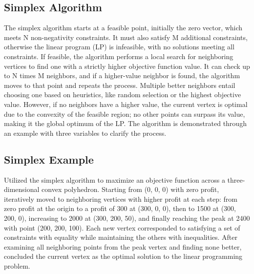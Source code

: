 \subsection*{Simplex Algorithm}
The simplex algorithm starts at a feasible point, initially the zero vector, which meets N non-negativity constraints.
It must also satisfy M additional constraints, otherwise the linear program (LP) is infeasible, with no solutions meeting all constraints.
If feasible, the algorithm performs a local search for neighboring vertices to find one with a strictly higher objective function value.
It can check up to N times M neighbors, and if a higher-value neighbor is found, the algorithm moves to that point and repeats the process.
Multiple better neighbors entail choosing one based on heuristics, like random selection or the highest objective value.
However, if no neighbors have a higher value, the current vertex is optimal due to the convexity of the feasible region; no other points can surpass its value, making it the global optimum of the LP\@.
The algorithm is demonstrated through an example with three variables to clarify the process.

\subsection*{Simplex Example}
Utilized the simplex algorithm to maximize an objective function across a three-dimensional convex polyhedron.
Starting from (0, 0, 0) with zero profit, iteratively moved to neighboring vertices with higher profit at each step: from zero profit at the origin to a profit of 300 at (300, 0, 0), then to 1500 at (300, 200, 0), increasing to 2000 at (300, 200, 50), and finally reaching the peak at 2400 with point (200, 200, 100).
Each new vertex corresponded to satisfying a set of constraints with equality while maintaining the others with inequalities.
After examining all neighboring points from the peak vertex and finding none better, concluded the current vertex as the optimal solution to the linear programming problem.

